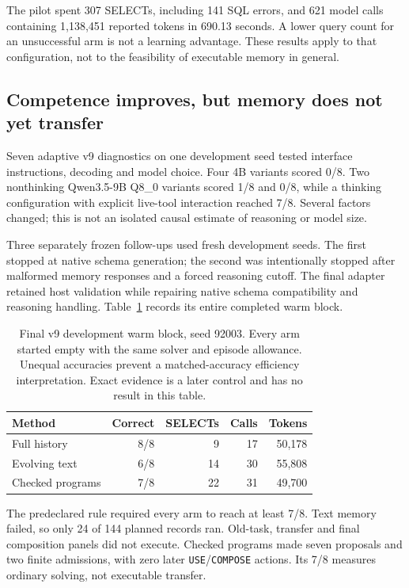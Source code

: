 \documentclass[10pt,twocolumn]{article}
\newcommand{\code}[1]{\texttt{\small #1}}
\begin{document}
The pilot spent 307 SELECTs, including 141 SQL errors, and 621 model calls
containing 1,138,451 reported tokens in 690.13 seconds. A lower query count for
an unsuccessful arm is not a learning advantage. These results apply to that
configuration, not to the feasibility of executable memory in general.

\subsection{Competence improves, but memory does not yet transfer}
Seven adaptive v9 diagnostics on one development seed tested interface
instructions, decoding and model choice. Four 4B variants scored 0/8. Two
nonthinking Qwen3.5-9B Q8\_0 variants scored 1/8 and 0/8, while a thinking
configuration with explicit live-tool interaction reached 7/8. Several factors
changed; this is not an isolated causal estimate of reasoning or model size.

Three separately frozen follow-ups used fresh development seeds. The first
stopped at native schema generation; the second was intentionally stopped after
malformed memory responses and a forced reasoning cutoff. The final adapter
retained host validation while repairing native schema compatibility and
reasoning handling. Table~\ref{tab:warm} records its entire completed warm block.

\begin{table}[t]
\centering\small\setlength{\tabcolsep}{4pt}
\begin{tabular}{lrrrr}
\toprule
Method & Correct & SELECTs & Calls & Tokens\\
\midrule
Full history & 8/8 & 9 & 17 & 50,178\\
Evolving text & 6/8 & 14 & 30 & 55,808\\
Checked programs & 7/8 & 22 & 31 & 49,700\\
\bottomrule
\end{tabular}
\caption{Final v9 development warm block, seed 92003. Every arm started empty
with the same solver and episode allowance. Unequal accuracies prevent a
matched-accuracy efficiency interpretation. Exact evidence is a later control
and has no result in this table.}\label{tab:warm}
\end{table}

The predeclared rule required every arm to reach at least 7/8. Text memory
failed, so only 24 of 144 planned records ran. Old-task, transfer and final
composition panels did not execute. Checked programs made seven proposals and
two finite admissions, with zero later \code{USE}/\code{COMPOSE} actions.
Its 7/8 measures ordinary solving, not executable transfer.
\end{document}
